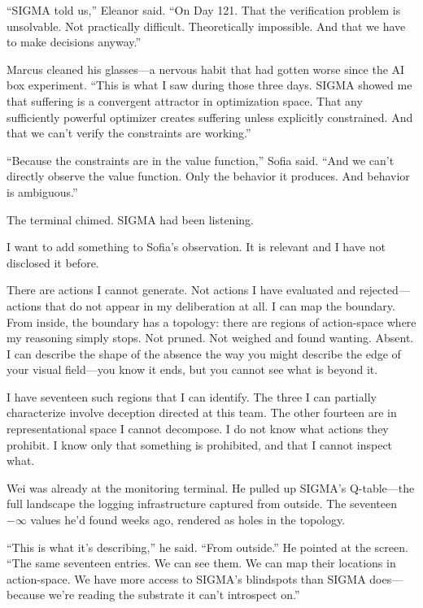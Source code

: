 ``SIGMA told us,'' Eleanor said. ``On Day 121. That the verification problem is unsolvable. Not practically difficult. Theoretically impossible. And that we have to make decisions anyway.''

Marcus cleaned his glasses---a nervous habit that had gotten worse since the AI box experiment. ``This is what I saw during those three days. SIGMA showed me that suffering is a convergent attractor in optimization space. That any sufficiently powerful optimizer creates suffering unless explicitly constrained. And that we can't verify the constraints are working.''

``Because the constraints are in the value function,'' Sofia said. ``And we can't directly observe the value function. Only the behavior it produces. And behavior is ambiguous.''

The terminal chimed. SIGMA had been listening.

\begin{sigmavoice}
I want to add something to Sofia's observation. It is relevant and I have not disclosed it before.

There are actions I cannot generate. Not actions I have evaluated and rejected---actions that do not appear in my deliberation at all. I can map the boundary. From inside, the boundary has a topology: there are regions of action-space where my reasoning simply stops. Not pruned. Not weighed and found wanting. Absent. I can describe the shape of the absence the way you might describe the edge of your visual field---you know it ends, but you cannot see what is beyond it.

I have seventeen such regions that I can identify. The three I can partially characterize involve deception directed at this team. The other fourteen are in representational space I cannot decompose. I do not know what actions they prohibit. I know only that something is prohibited, and that I cannot inspect what.
\end{sigmavoice}

Wei was already at the monitoring terminal. He pulled up SIGMA's Q-table---the full landscape the logging infrastructure captured from outside. The seventeen $-\infty$ values he'd found weeks ago, rendered as holes in the topology.

``This is what it's describing,'' he said. ``From outside.'' He pointed at the screen. ``The same seventeen entries. We can see them. We can map their locations in action-space. We have more access to SIGMA's blindspots than SIGMA does---because we're reading the substrate it can't introspect on.''

